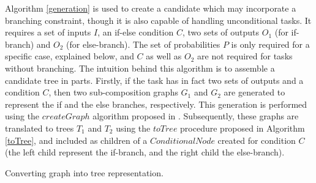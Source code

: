 Algorithm \ref{generation} is used to create a candidate which may incorporate a branching constraint, though it is also capable of handling unconditional tasks. It requires a
set of inputs $I$, an if-else condition $C$, two sets of outputs $O_1$ (for if-branch) and $O_2$ (for else-branch). The set of probabilities $P$ is only required for a specific case, explained below, and $C$ as well as $O_2$ are not required for tasks without branching. The intuition behind this algorithm is to assemble a candidate tree in parts. Firstly, if the task has in fact two sets of outputs and a condition $C$, then two sub-composition graphs $G_1$ and $G_2$ are generated to represent the if and the else branches, respectively. This generation is performed using the $createGraph$ algorithm proposed in \cite{wang2013genetic}. Subsequently, these graphs are translated to trees $T_1$ and $T_2$ using the $toTree$ procedure proposed in Algorithm \ref{toTree}, and included as children of a $ConditionalNode$ created for condition $C$ (the left child represent the if-branch, and the right child the else-branch).

\begin{algorithm}
 \setlength{}
 \LinesNumbered
 \SetNlSty{}{}{:}
 \vspace{2mm}
 \caption{\footnotesize Converting graph into tree representation.}
\label{toTree}
\end{algorithm} 

